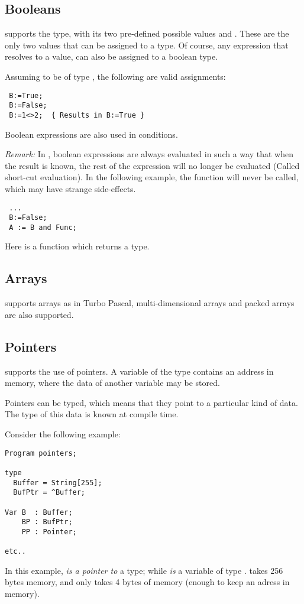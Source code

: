 \documentclass{report}
\begin{document}
\subsection{Booleans}
\fpc supports the  type, with its two pre-defined possible
values  and . These are the only two values that can be
assigned to a  type. Of course, any expression that resolves
to a  value, can also be assigned to a boolean type.

Assuming  to be of type , the following are valid
assignments:
\begin{verbatim}
 B:=True;
 B:=False;
 B:=1<>2;  { Results in B:=True }
\end{verbatim}
Boolean expressions are also used in conditions.

{\em Remark:} In \fpc, boolean expressions are always evaluated in such a
way that when the result is known, the rest of the expression will no longer
be evaluated (Called short-cut evaluation). In the following example, the function  will never
be called, which may have strange side-effects.
\begin{verbatim}
 ...
 B:=False;
 A := B and Func;
\end{verbatim} 
Here  is a function which returns a  type.

\subsection{Arrays}
\fpc supports arrays as in Turbo Pascal, multi-dimensional arrays 
and packed arrays are also supported.

\subsection{Pointers}
\fpc supports the use of pointers. A variable of the type 
contains an address in memory, where the data of another variable may be 
stored.

Pointers can be typed, which means that they point to a particular kind of
data. The type of this data is known at compile time.

Consider the following example:
\begin{CodEx}
\begin{verbatim}
Program pointers;

type 
  Buffer = String[255];
  BufPtr = ^Buffer;

Var B  : Buffer;
    BP : BufPtr;
    PP : Pointer;

etc..
\end{verbatim}
\end{CodEx}
In this example,  {\em is a pointer to} a  type; while 
{\em is} a variable of type .  takes 256 bytes memory,
and  only takes 4 bytes of memory (enough to keep an adress in
memory).
\end{document}
